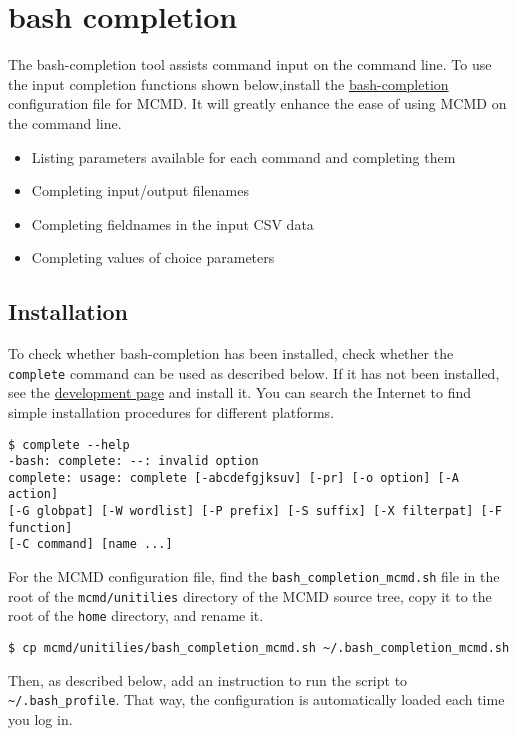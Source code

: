
%

\section{bash completion\label{sect:whatis}}
The bash-completion tool assists command input on the command line.
To use the input completion functions shown below,install the 
\href{https://github.com/scop/bash-completion}{bash-completion}
configuration file for MCMD.
It will greatly enhance the ease of using MCMD on the command line.
\begin{itemize}
\item Listing parameters available for each command and completing them
\item Completing input/output filenames 
\item Completing fieldnames in the input CSV data 
\item Completing values of choice parameters
\end{itemize}

\subsection{Installation\label{sect:bash_comp_install}}
To check whether bash-completion has been installed, check whether the \verb|complete| command can be used as described below.
If it has not been installed, see the 
\href{https://github.com/scop/bash-completion}{development page}
and install it.
You can search the Internet to find simple installation procedures for different platforms.

\begin{Verbatim}[baselinestretch=0.7,frame=single]
$ complete --help
-bash: complete: --: invalid option
complete: usage: complete [-abcdefgjksuv] [-pr] [-o option] [-A action]
[-G globpat] [-W wordlist] [-P prefix] [-S suffix] [-X filterpat] [-F function]
[-C command] [name ...]
\end{Verbatim}

For the MCMD configuration file, find the \verb|bash_completion_mcmd.sh| file in the root of the \verb|mcmd/unitilies| directory of the MCMD source tree, copy it to the root of the \verb|home| directory, and rename it.

\begin{Verbatim}[baselinestretch=0.7,frame=single]
$ cp mcmd/unitilies/bash_completion_mcmd.sh ~/.bash_completion_mcmd.sh
\end{Verbatim}
Then, as described below, add an instruction to run the script to \verb|~/.bash_profile|. 
That way, the configuration is automatically loaded each time you log in.

